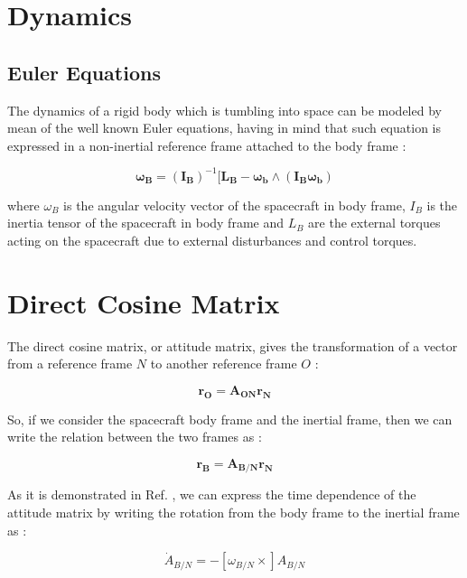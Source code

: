 \section{Dynamics}

\subsection{Euler Equations}

The dynamics of a rigid body which is tumbling into space can be modeled by mean of the well known Euler equations, having in mind that such equation is expressed in a non-inertial reference frame attached to the body frame : 

\begin{equation}
  \mathbf{\omega_B} = \mathbf{(I_B)}^{-1} [\mathbf{L_B} - \mathbf{\omega_b}  \wedge (\mathbf{I_B} \mathbf{\omega_b})
\end{equation}

where \textbf{$\omega_B$} is the angular velocity vector of the spacecraft in body frame, \textbf{$I_B$} is the inertia tensor of the spacecraft in body frame and \textbf{$L_B$} are the external torques acting on the spacecraft due to  external disturbances and control torques.

\section{Direct Cosine Matrix}
The direct cosine matrix, or attitude matrix, gives the transformation of a vector from a reference frame $N$ to another reference frame $O$ : 

\begin{equation}
 \mathbf{r_{O}} = \mathbf{A_{ON}} \mathbf{r_{N}}
\end{equation}

So, if we consider the spacecraft body frame and the inertial frame, then we can write the relation between the two frames as : 

\begin{equation}
 \mathbf{r_{B}} = \mathbf{A_{B/N}} \mathbf{r_{N}}
\end{equation}

As it is demonstrated in Ref. \cite{Markley2014}, we can express the time dependence of the attitude matrix by writing the rotation from the body frame to the inertial frame as : 

\begin{equation}
 \dot{A}_{B/N}= - [\omega_{B/N} \times]A_{B/N} 
\end{equation}

